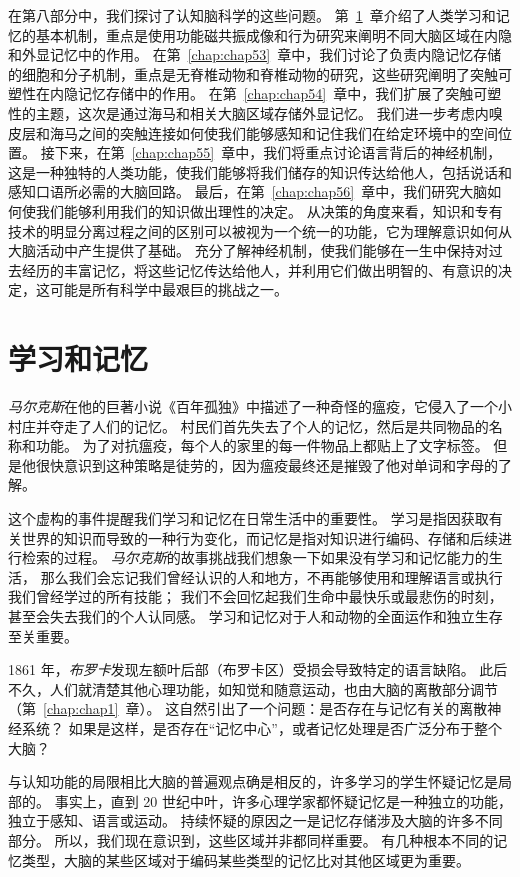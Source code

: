 在第八部分中，我们探讨了认知脑科学的这些问题。
第~\ref{chap:chap52}~章介绍了人类学习和记忆的基本机制，重点是使用功能磁共振成像和行为研究来阐明不同大脑区域在内隐和外显记忆中的作用。
在第~\ref{chap:chap53}~章中，我们讨论了负责内隐记忆存储的细胞和分子机制，重点是无脊椎动物和脊椎动物的研究，这些研究阐明了突触可塑性在内隐记忆存储中的作用。
在第~\ref{chap:chap54}~章中，我们扩展了突触可塑性的主题，这次是通过海马和相关大脑区域存储外显记忆。
我们进一步考虑内嗅皮层和海马之间的突触连接如何使我们能够感知和记住我们在给定环境中的空间位置。
接下来，在第~\ref{chap:chap55}~章中，我们将重点讨论语言背后的神经机制，这是一种独特的人类功能，使我们能够将我们储存的知识传达给他人，包括说话和感知口语所必需的大脑回路。
最后，在第~\ref{chap:chap56}~章中，我们研究大脑如何使我们能够利用我们的知识做出理性的决定。
从决策的角度来看，知识和专有技术的明显分离过程之间的区别可以被视为一个统一的功能，它为理解意识如何从大脑活动中产生提供了基础。
充分了解神经机制，使我们能够在一生中保持对过去经历的丰富记忆，将这些记忆传达给他人，并利用它们做出明智的、有意识的决定，这可能是所有科学中最艰巨的挑战之一。



\chapter{学习和记忆} \label{chap:chap52}

\textit{马尔克斯}在他的巨著小说《百年孤独》中描述了一种奇怪的瘟疫，它侵入了一个小村庄并夺走了人们的记忆。
村民们首先失去了个人的记忆，然后是共同物品的名称和功能。
为了对抗瘟疫，每个人的家里的每一件物品上都贴上了文字标签。
但是他很快意识到这种策略是徒劳的，因为瘟疫最终还是摧毁了他对单词和字母的了解。


这个虚构的事件提醒我们学习和记忆在日常生活中的重要性。
学习是指因获取有关世界的知识而导致的一种行为变化，而记忆是指对知识进行编码、存储和后续进行检索的过程。
\textit{马尔克斯}的故事挑战我们想象一下如果没有学习和记忆能力的生活，
那么我们会忘记我们曾经认识的人和地方，不再能够使用和理解语言或执行我们曾经学过的所有技能；
我们不会回忆起我们生命中最快乐或最悲伤的时刻，甚至会失去我们的个人认同感。
学习和记忆对于人和动物的全面运作和独立生存至关重要。


1861 年，\textit{布罗卡}发现左额叶后部（布罗卡区）受损会导致特定的语言缺陷。
此后不久，人们就清楚其他心理功能，如知觉和随意运动，也由大脑的离散部分调节（第~\ref{chap:chap1}~章）。
这自然引出了一个问题：是否存在与记忆有关的离散神经系统？
如果是这样，是否存在“记忆中心”，或者记忆处理是否广泛分布于整个大脑？


与认知功能的局限相比大脑的普遍观点确是相反的，许多学习的学生怀疑记忆是局部的。
事实上，直到 20 世纪中叶，许多心理学家都怀疑记忆是一种独立的功能，独立于感知、语言或运动。
持续怀疑的原因之一是记忆存储涉及大脑的许多不同部分。
所以，我们现在意识到，这些区域并非都同样重要。
有几种根本不同的记忆类型，大脑的某些区域对于编码某些类型的记忆比对其他区域更为重要。



